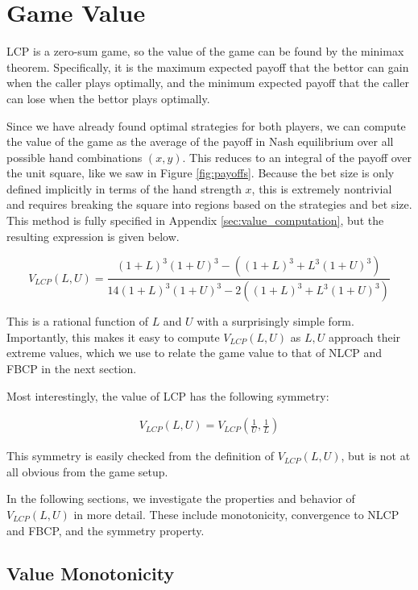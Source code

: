 \documentclass[../../main/main.tex]{subfiles}
\begin{document}
\section{Game Value}
\label{sec:game_value}

LCP is a zero-sum game, so the value of the game can be found by the minimax theorem. Specifically, it is the maximum expected payoff that the bettor can gain when the caller plays optimally, and the minimum expected payoff that the caller can lose when the bettor plays optimally.

Since we have already found optimal strategies for both players, we can compute the value of the game as the average of the payoff in Nash equilibrium over all possible hand combinations $(x, y)$. This reduces to an integral of the payoff over the unit square, like we saw in Figure \ref{fig:payoffs}. Because the bet size is only defined implicitly in terms of the hand strength $x$, this is extremely nontrivial and requires breaking the square into regions based on the strategies and bet size. This method is fully specified in Appendix \ref{sec:value_computation}, but the resulting expression is given below.

\[
    V_{LCP}(L, U) = \frac{(1 + L)^3(1+U)^3 - ((1+L)^3+L^3(1 + U)^3)}{14(1 + L)^3(1+U)^3 - 2((1+L)^3+L^3(1 + U)^3)}
\]

This is a rational function of $L$ and $U$ with a surprisingly simple form.  Importantly, this makes it easy to compute $V_{LCP}(L, U)$ as $L, U$ approach their extreme values, which we use to relate the game value to that of NLCP and FBCP in the next section. 

Most interestingly, the value of LCP has the following symmetry:

\begin{align*}
    V_{LCP}(L, U) = V_{LCP}\left(\frac{1}{U}, \frac{1}{L}\right)
\end{align*}

This symmetry is easily checked from the definition of $V_{LCP}(L, U)$, but is not at all obvious from the game setup.

In the following sections, we investigate the properties and behavior of $V_{LCP}(L, U)$ in more detail. These include monotonicity, convergence to NLCP and FBCP, and the symmetry property.


\subsection{Value Monotonicity}
\end{document}
